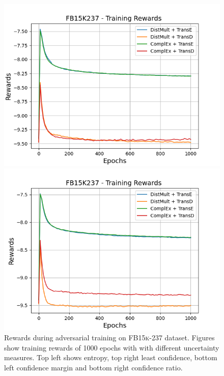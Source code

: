\begin{figure}[H]
\begin{minipage}{.45\textwidth}
      \includegraphics[width=0.9\linewidth]{figures/results/gan_train/not_pretrained/uncertainty/max_distribution/confidence_margin/fb15k237/uncertainty_fb15k237_rew.png}
    \end{minipage}%
    \begin{minipage}{.45\textwidth}
      \centering
      \includegraphics[width=0.9\linewidth]{figures/results/gan_train/not_pretrained/uncertainty/max_distribution/confidence_ratio/fb15k237/uncertainty_fb15k237_rew.png}
    \end{minipage}%
    \caption{Rewards during adversarial training on \textsc{FB15k-237} dataset. 
    Figures show training rewards of 1000 epochs with \ussoftmax with different uncertainty measures.
    Top left shows entropy, top right least confidence, 
    bottom left confidence margin and bottom right confidence ratio.}
    \label{fig:advtrain_metrics_fb15k237_rew}
\end{figure}
